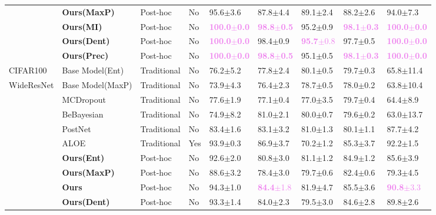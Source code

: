 \begin{table}[t]
\begin{center}
\begin{tabular}{lllllllll}
              & \textbf{Ours(MaxP)} & Post-hoc & No & 95.6$\pm$3.6 & 87.8$\pm$4.4 &89.1$\pm$2.4 &  88.2$\pm$2.6 & 94.0$\pm$7.3 \\
              & \textbf{Ours(MI)} & Post-hoc & No & \textcolor{violet}{\textbf{100.0$\pm$0.0}} & \textcolor{violet}{\textbf{98.8$\pm$0.5}} & 95.2$\pm$0.9 &  \textcolor{violet}{\textbf{98.1$\pm$0.3}} & \textcolor{violet}{\textbf{100.0$\pm$0.0}} \\
              & \textbf{Ours(Dent)} & Post-hoc & No & \textcolor{violet}{\textbf{100.0$\pm$0.0}} & 98.4$\pm$0.9 & \textcolor{violet}{\textbf{95.7}$\pm$0.8} &  97.7$\pm$0.5 & \textcolor{violet}{\textbf{100.0$\pm$0.0}} \\
               & \textbf{Ours(Prec)} & Post-hoc & No & \textcolor{violet}{\textbf{100.0$\pm$0.0}} & \textcolor{violet}{\textbf{98.8$\pm$0.5}} & 95.1$\pm$0.5 &  \textcolor{violet}{\textbf{98.1$\pm$0.3}} & \textcolor{violet}{\textbf{100.0$\pm$0.0}} \\
    \toprule
    CIFAR100 & Base Model(Ent) & Traditional & No & 76.2$\pm$5.2 & 77.8$\pm$2.4 & 80.1$\pm$0.5 & 79.7$\pm$0.3 & 65.8$\pm$11.4  \\
    WideResNet   & Base Model(MaxP) & Traditional & No & 73.9$\pm$4.3 & 76.4$\pm$2.3 & 78.7$\pm$0.5 & 78.0$\pm$0.2 & 63.8$\pm$10.4   \\
              & MCDropout & Traditional & No & 77.6$\pm$1.9 & 77.1$\pm$0.4 & 77.0$\pm$3.5 & 79.7$\pm$0.4 & 64.4$\pm$8.9   \\
              & BeBayesian &Traditional & No & 74.9$\pm$8.2 & 81.0$\pm$2.1 & 80.0$\pm$0.7 & 79.6$\pm$0.2 & 63.0$\pm$13.7   \\
              & PostNet & Traditional & No & 83.4$\pm$1.6 & 83.1$\pm$3.2 & 81.0$\pm$1.3 & 80.1$\pm$1.1 & 87.7$\pm$4.2  \\
              & ALOE & Traditional & Yes & 93.9$\pm$0.3 & 86.9$\pm$3.7 & 70.2$\pm$1.2 & 85.3$\pm$3.7 & 92.2$\pm$1.5  \\
    \hline
              & \textbf{Ours(Ent)} & Post-hoc & No & 92.6$\pm$2.0 & 80.8$\pm$3.0 & 81.1$\pm$1.2 &  84.9$\pm$1.2& 85.6$\pm$3.9 \\
              & \textbf{Ours(MaxP)} & Post-hoc & No & 88.6$\pm$3.2 & 78.4$\pm$3.0 & 79.7$\pm$0.6 &  82.4$\pm$0.6& 79.3$\pm$4.5 \\
              & \textbf{Ours} & Post-hoc & No & 94.3$\pm$1.0 & \textcolor{violet}{\textbf{84.4}$\pm$1.8} & 81.9$\pm$4.7 &  85.5$\pm$3.6 & \textcolor{violet}{\textbf{90.8}$\pm$3.3} \\
              & \textbf{Ours(Dent)} & Post-hoc & No & 93.3$\pm$1.4 & 84.0$\pm$2.3 & 79.5$\pm$3.0 &  84.6$\pm$2.8& 89.8$\pm$2.6 \\

\end{tabular}
\end{center}
\end{table}
